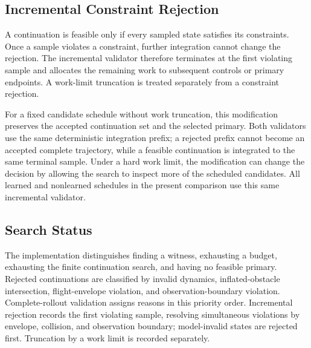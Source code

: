 \subsection{Incremental Constraint Rejection}
A continuation is feasible only if every sampled state satisfies its constraints. Once a sample violates a constraint, further integration cannot change the rejection. The incremental validator therefore terminates at the first violating sample and allocates the remaining work to subsequent controls or primary endpoints. A work-limit truncation is treated separately from a constraint rejection.

For a fixed candidate schedule without work truncation, this modification preserves the accepted continuation set and the selected primary. Both validators use the same deterministic integration prefix; a rejected prefix cannot become an accepted complete trajectory, while a feasible continuation is integrated to the same terminal sample. Under a hard work limit, the modification can change the decision by allowing the search to inspect more of the scheduled candidates. All learned and nonlearned schedules in the present comparison use this same incremental validator.

\subsection{Search Status}
The implementation distinguishes finding a witness, exhausting a budget, exhausting the finite continuation search, and having no feasible primary. Rejected continuations are classified by invalid dynamics, inflated-obstacle intersection, flight-envelope violation, and observation-boundary violation. Complete-rollout validation assigns reasons in this priority order. Incremental rejection records the first violating sample, resolving simultaneous violations by envelope, collision, and observation boundary; model-invalid states are rejected first. Truncation by a work limit is recorded separately.
